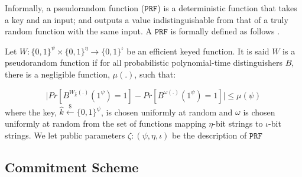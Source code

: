 Informally, a pseudorandom function ($\mathtt{PRF}$) is a deterministic function that takes a key and an input; and outputs a value  indistinguishable from that of  a truly random function with the same input.   A $\mathtt{PRF}$ is formally defined as follows \cite{DBLP:books/crc/KatzLindell2007}. 
\begin{definition} Let $W:\{0,1\}^{\scriptscriptstyle\psi}\times \{0,1\}^{\scriptscriptstyle \eta}\rightarrow \{0,1\}^{\scriptscriptstyle  \iota}$ be an efficient  keyed function. It is said $W$ is a pseudorandom function if for all probabilistic polynomial-time distinguishers $B$, there is a negligible function, $\mu(.)$, such that:

\begin{equation*}
\bigg | Pr[B^{\scriptscriptstyle W_{\hat{k}}(.)}(1^{\scriptscriptstyle \psi})=1]- Pr[B^{\scriptscriptstyle \omega(.)}(1^{\scriptscriptstyle \psi})=1] \bigg |\leq \mu(\psi)
\end{equation*}
where  the key, $\hat{k}\stackrel{\scriptscriptstyle\$}\leftarrow\{0,1\}^{\scriptscriptstyle\psi}$, is chosen uniformly at random and $\omega$ is chosen uniformly at random from the set of functions mapping $\eta$-bit strings to $\iota$-bit strings. We let public parameters $\zeta:(\psi,\eta, \iota)$ be the description of $\mathtt{PRF}$
\end{definition}



\subsection{Commitment Scheme}



